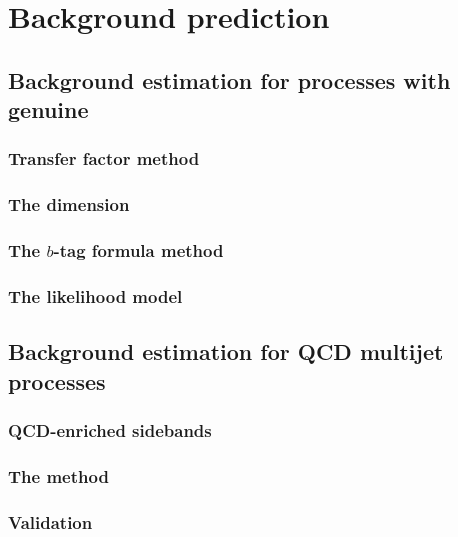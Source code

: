 \chapter{Background prediction} %
\label{chap:backgroundPred}

\section{Background estimation for processes with genuine \MET}

\subsection{Transfer factor method}

\subsection{The \MHT dimension} %
\label{sec:mhtDim}


\subsection{The $b$-tag formula method}

\subsection{The likelihood model} %

\section{Background estimation for QCD multijet processes} %
\label{sec:qcdEstimation}

\subsection{QCD-enriched sidebands}

\subsection{The method}

\subsection{Validation} %

